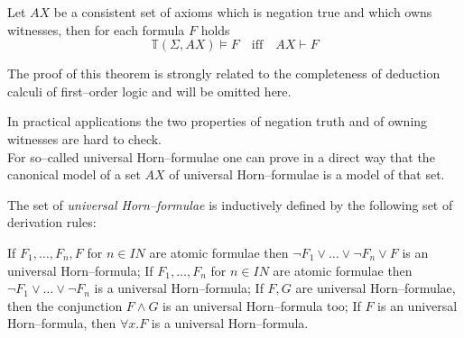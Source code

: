 \documentclass[landscape, autoslides, light]{mmiss}
\newcommand{\ns}{\normalsize}
\newcommand{\nat}{{I\!\!N}}
\begin{document}
\begin{Package}[Label={FSDPT}, Title={Formal Specification of Data and Process Types}, ShortTitle={FSDPT}, Authors={Horst Reichel}, Date={February 2003}, LevelOfDetail=Lecture, Language=en-GB]
\begin{Section}[Title={Initial Algebras as Data Types}, Label={section3}]
\begin{Section}[Title={Existence of initial models}, Label={section3_1}]
\begin{Paragraph}[Label=Paragraph36]
\end{Paragraph}
\begin{Paragraph}[Label=Paragraph37]
\ns
\begin{Theorem}[Title = {Initial Algebras as Data Types}, Label = {Theorem2}] Let $AX$ be a consistent set
of axioms which is negation true and which owns witnesses, then
for each formula $F$ holds
$$\mathbb{T}(\Sigma,AX) \vDash F \quad \mbox{iff} \quad AX \vdash
F$$
\end{Theorem}\pause
\small

The proof of this theorem is strongly related to the completeness
of deduction calculi of first--order logic and will be omitted
here.


\end{Paragraph}
\begin{Paragraph}[Label=Paragraph38]

In practical applications the two properties of
negation truth and of owning witnesses are hard to check. \\
\pause For so--called universal Horn--formulae one can prove in a
direct way that the canonical model of a set $AX$  of universal
Horn--formulae is a model of that set.


\end{Paragraph}
\begin{Paragraph}[Title={Universal Horn--formulae}, Label=Paragraph39]
The set of \emph{universal Horn--formulae} is inductively defined
by the following set of derivation rules:
\begin{List}[ListType=enumeration]
  \ListItem  If $F_1, \ldots , F_n, F$ for $n \in \nat$ are atomic
  formulae then $\neg F_1 \vee \ldots \vee \neg F_n \vee F$ is an
  universal Horn--formula; \pause
  \ListItem If $F_1, \ldots , F_n$ for $n \in \nat$ are atomic
  formulae then $\neg F_1 \vee \ldots \vee \neg F_n$ is a
  universal Horn--formula;\pause
  \ListItem If $F, G$ are universal Horn--formulae, then the conjunction $F
  \wedge G$ is an universal Horn--formula too; \pause
  \ListItem If $F$ is an universal Horn--formula, then $\forall x . F$
  is a universal Horn--formula.
\end{List}



\end{Paragraph}
\end{Section}
\end{Section}
\end{Package}
\end{document}
